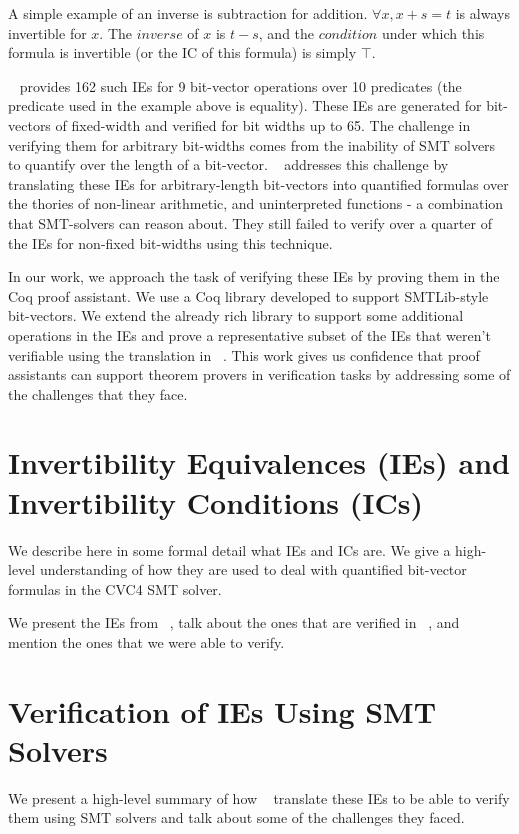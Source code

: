 \documentclass[submission,copyright,creativecommons]{eptcs}
\begin{document}
A simple example of an inverse is 
subtraction for addition. 
$\forall x, x + s = t$ is always invertible for $x$. The 
$inverse$ of $x$ is $t - s$, and the $condition$ under which 
this formula is invertible (or the IC of this formula) is
simply $\top$. 

~\cite{DBLP:conf/cav/NiemetzPRBT18} provides 162 such 
IEs for 9 bit-vector operations over 10 predicates 
(the predicate used in the example above is equality). These 
IEs are generated for bit-vectors of fixed-width and 
verified for bit widths up to 65. The challenge in 
verifying them for arbitrary bit-widths comes from the 
inability of SMT solvers to quantify over the length 
of a bit-vector. ~\cite{yoni} addresses this challenge
by translating these IEs for arbitrary-length bit-vectors 
into quantified formulas over the thories of non-linear 
arithmetic, and uninterpreted functions - a combination 
that SMT-solvers can reason about. They still failed to 
verify over a quarter of the IEs for non-fixed bit-widths
using this technique.

In our work, we approach the task of verifying these 
IEs by proving them in the Coq proof assistant. We use a 
Coq library developed to support SMTLib-style 
bit-vectors. We extend the already rich library to support 
some additional operations in the IEs and prove a 
representative subset 
of the IEs that weren't verifiable using the translation in 
~\cite{yoni}. This work gives us confidence that proof 
assistants can support theorem provers in verification 
tasks by addressing some of the challenges that they 
face. 

\section{Invertibility Equivalences (IEs) and 
	Invertibility Conditions (ICs)}
We describe here in some formal detail what IEs and ICs are.
We give a high-level understanding of how they are 
used to deal with quantified bit-vector formulas in the 
CVC4 SMT solver. 

We present the IEs from ~\cite{DBLP:conf/cav/NiemetzPRBT18}, talk about the ones that are verified in ~\cite{yoni}, 
and mention the ones that we were able to verify.

\section{Verification of IEs Using SMT Solvers}
We present a high-level summary of how ~\cite{yoni} translate 
these IEs to be able to verify them using SMT solvers 
and talk about some of the challenges they faced.
\end{document}
